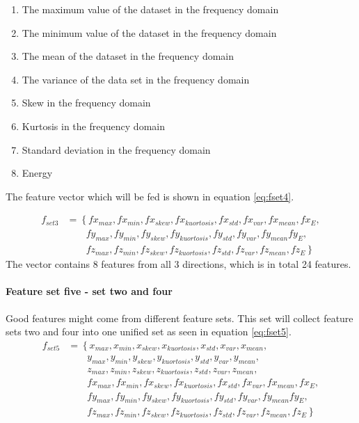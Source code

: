 \documentclass[USenglish]{ifimaster}  %
\begin{document}
\begin{enumerate}
		\item The maximum value of the dataset in the frequency domain
		\item The minimum value of the dataset in the frequency domain
		\item The mean of the dataset in the frequency domain
		\item The variance of the data set in the frequency domain
		\item Skew in the frequency domain
		\item Kurtosis in the frequency domain 
		\item Standard deviation in the frequency domain
		\item Energy 
\end{enumerate}
The feature vector which will be fed is shown in equation \ref{eq:fset4}.

\begin{align}\label{eq:fset4}
	f_{set3} &= \left\{ fx_{max},fx_{min},fx_{skew},fx_{kuortosis},fx_{std},fx_{var},fx_{mean},fx_{E}, \right.\nonumber\\
	&\qquad \left. {} fy_{max},fy_{min},fy_{skew},fy_{kuortosis},fy_{std},fy_{var},fy_{mean}fy_{E}, \right.\nonumber\\
	&\qquad \left. {} fz_{max},fz_{min},fz_{skew},fz_{kuortosis},fz_{std},fz_{var},fz_{mean},fz_{E} \right\}
	\end{align}
The vector contains 8 features from all 3 directions, which is in total 24 features. 
	
\paragraph{Feature set five - set two and four} 
Good features might come from different feature sets. This set will collect feature sets two and four into one unified set as seen in equation \ref{eq:fset5}. 
	\begin{align}\label{eq:fset5}
	f_{set5} &= \left\{ x_{max},x_{min},x_{skew},x_{kuortosis},x_{std},x_{var},x_{mean}, \right.\nonumber\\
	&\qquad \left. {}   y_{max},y_{min},y_{skew},y_{kuortosis},y_{std},y_{var},y_{mean}, \right.\nonumber\\
	&\qquad \left. {}  z_{max},z_{min},z_{skew},z_{kuortosis},z_{std},z_{var},z_{mean}, \right.\nonumber\\
	&\qquad \left. {} fx_{max},fx_{min},fx_{skew},fx_{kuortosis},fx_{std},fx_{var},fx_{mean},fx_{E}, \right.\nonumber\\
	&\qquad \left. {} fy_{max},fy_{min},fy_{skew},fy_{kuortosis},fy_{std},fy_{var},fy_{mean}fy_{E}, \right.\nonumber\\
	&\qquad \left. {} fz_{max},fz_{min},fz_{skew},fz_{kuortosis},fz_{std},fz_{var},fz_{mean},fz_{E} \right\}
	\end{align}
	
\end{document}

